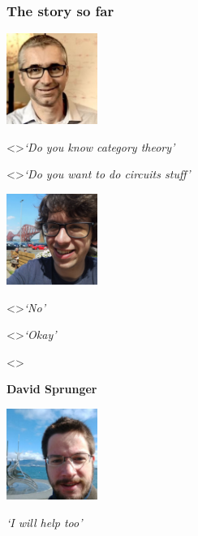 \begin{frame}
    \frametitle{The story so far}

    \centering

    \begin{minipage}{0.45\textwidth}
        \centering


        \vspace{0.5em}

        \includegraphics[width=8em]{imgs/ghica}

        \visible<\iftoggle{static}{1}{2-}>{\emph{`Do you know category theory'}}

        \visible<\iftoggle{static}{1}{4-}>{\emph{`Do you want to do circuits stuff'}}
    \end{minipage}
    \begin{minipage}{0.25\textwidth}
        \centering


        \vspace{0.5em}

        \includegraphics[width=8em]{imgs/kaye}%

        \visible<\iftoggle{static}{1}{3-}>{\emph{`No'}}

        \visible<\iftoggle{static}{1}{5-}>{\emph{`Okay'}}
    \end{minipage}
    \visible<\iftoggle{static}{1}{6-}>{%
        \begin{minipage}{0.25\textwidth}
            \centering

            \textbf{David Sprunger}

            \vspace{0.5em}

            \includegraphics[width=8em]{imgs/sprunger}

            \phantom{hello}

            \emph{`I will help too'}
        \end{minipage}%
    }
\end{frame}